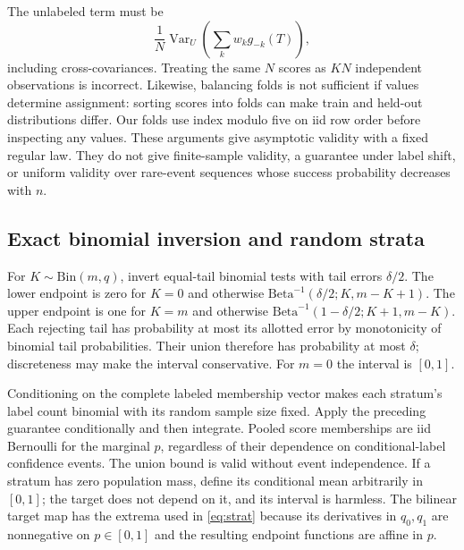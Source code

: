 \documentclass{article}
\newcommand{\V}{\operatorname{Var}}
\begin{document}
The unlabeled term must be
\[
\frac1N\V_U\!\left(\sum_k w_k g_{-k}(T)\right),
\]
including cross-covariances. Treating the same $N$ scores as $KN$ independent observations is incorrect. Likewise, balancing folds is not sufficient if values determine assignment: sorting scores into folds can make train and held-out distributions differ. Our folds use index modulo five on iid row order before inspecting any values. These arguments give asymptotic validity with a fixed regular law. They do not give finite-sample validity, a guarantee under label shift, or uniform validity over rare-event sequences whose success probability decreases with $n$.

\subsection{Exact binomial inversion and random strata}
For $K\sim\mathrm{Bin}(m,q)$, invert equal-tail binomial tests with tail errors $\delta/2$. The lower endpoint is zero for $K=0$ and otherwise $\mathrm{Beta}^{-1}(\delta/2;K,m-K+1)$. The upper endpoint is one for $K=m$ and otherwise $\mathrm{Beta}^{-1}(1-\delta/2;K+1,m-K)$. Each rejecting tail has probability at most its allotted error by monotonicity of binomial tail probabilities. Their union therefore has probability at most $\delta$; discreteness may make the interval conservative. For $m=0$ the interval is $[0,1]$.

Conditioning on the complete labeled membership vector makes each stratum's label count binomial with its random sample size fixed. Apply the preceding guarantee conditionally and then integrate. Pooled score memberships are iid Bernoulli for the marginal $p$, regardless of their dependence on conditional-label confidence events. The union bound is valid without event independence. If a stratum has zero population mass, define its conditional mean arbitrarily in $[0,1]$; the target does not depend on it, and its interval is harmless. The bilinear target map has the extrema used in \cref{eq:strat} because its derivatives in $q_0,q_1$ are nonnegative on $p\in[0,1]$ and the resulting endpoint functions are affine in $p$.
\end{document}
